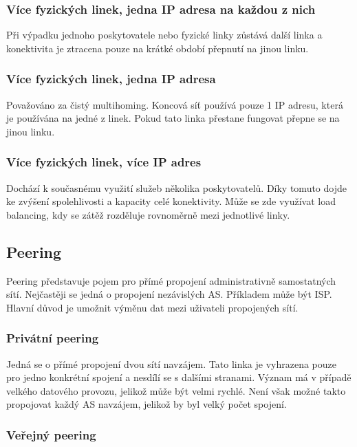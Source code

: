\subsubsection{Více fyzických linek, jedna IP adresa na každou z nich}

Při výpadku jednoho poskytovatele nebo fyzické linky zůstává další linka a konektivita je ztracena pouze na krátké období přepnutí na jinou linku.

\subsubsection{Více fyzických linek, jedna IP adresa }

Považováno za čistý multihoming.
Koncová síť používá pouze 1 IP adresu, která je používána na jedné z linek.
Pokud tato linka přestane fungovat přepne se na jinou linku.

\subsubsection{Více fyzických linek, více IP adres}

Dochází k současnému využití služeb několika poskytovatelů.
Díky tomuto dojde ke zvýšení spolehlivosti a kapacity celé konektivity.
Může se zde využívat load balancing, kdy se zátěž rozděluje rovnoměrně mezi jednotlivé linky.

\subsection{Peering}

Peering představuje pojem pro přímé propojení administrativně samostatných sítí.
Nejčastěji se jedná o propojení nezávislých AS.
Příkladem může být ISP.
Hlavní důvod je umožnit výměnu dat mezi uživateli propojených sítí.

\subsubsection{Privátní peering}

Jedná se o přímé propojení dvou sítí navzájem.
Tato linka je vyhrazena pouze pro jedno konkrétní spojení a nesdílí se s dalšími stranami.
Význam má v případě velkého datového provozu, jelikož může být velmi rychlé.
Není však možné takto propojovat každý AS navzájem, jelikož by byl velký počet spojení.

\subsubsection{Veřejný peering}

